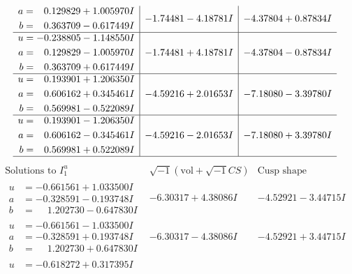 \documentclass[1p]{elsarticle_modified}
\theoremstyle{definition}
\newcommand{\I}{\sqrt{-1}}
\begin{document}
$$\begin{array}{c|c|c}
\begin{aligned}
a &= \phantom{-}0.129829 + 1.005970 I \\
b &= \phantom{-}0.363709 - 0.617449 I\end{aligned}
 & -1.74481 - 4.18781 I & -4.37804 + 0.87834 I \\ \hline\begin{aligned}
u &= -0.238805 - 1.148550 I \\
a &= \phantom{-}0.129829 - 1.005970 I \\
b &= \phantom{-}0.363709 + 0.617449 I\end{aligned}
 & -1.74481 + 4.18781 I & -4.37804 - 0.87834 I \\ \hline\begin{aligned}
u &= \phantom{-}0.193901 + 1.206350 I \\
a &= \phantom{-}0.606162 + 0.345461 I \\
b &= \phantom{-}0.569981 - 0.522089 I\end{aligned}
 & -4.59216 + 2.01653 I & -7.18080 - 3.39780 I \\ \hline\begin{aligned}
u &= \phantom{-}0.193901 - 1.206350 I \\
a &= \phantom{-}0.606162 - 0.345461 I \\
b &= \phantom{-}0.569981 + 0.522089 I\end{aligned}
 & -4.59216 - 2.01653 I & -7.18080 + 3.39780 I\\
 \hline 
 \end{array}$$\newpage$$\begin{array}{c|c|c}  
\text{Solutions to }I^u_{1}& \I (\text{vol} + \sqrt{-1}CS) & \text{Cusp shape}\\
 \hline 
\begin{aligned}
u &= -0.661561 + 1.033500 I \\
a &= -0.328591 - 0.193748 I \\
b &= \phantom{-}1.202730 - 0.647830 I\end{aligned}
 & -6.30317 + 4.38086 I & -4.52921 - 3.44715 I \\ \hline\begin{aligned}
u &= -0.661561 - 1.033500 I \\
a &= -0.328591 + 0.193748 I \\
b &= \phantom{-}1.202730 + 0.647830 I\end{aligned}
 & -6.30317 - 4.38086 I & -4.52921 + 3.44715 I \\ \hline\begin{aligned}
u &= -0.618272 + 0.317395 I \\

\end{aligned}
\end{array}$$
\end{document}
